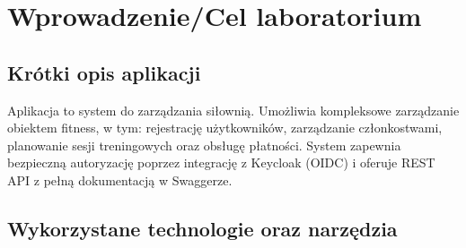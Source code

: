 \documentclass[../../spr.tex]{subfiles}
\begin{document}
\section{Wprowadzenie/Cel laboratorium}

\subsection{Krótki opis aplikacji}
Aplikacja to system do zarządzania siłownią.
Umożliwia kompleksowe zarządzanie obiektem fitness,
w tym: rejestrację użytkowników, zarządzanie członkostwami,
planowanie sesji treningowych oraz obsługę płatności.
System zapewnia bezpieczną autoryzację poprzez integrację z Keycloak (OIDC)
i oferuje REST API z pełną dokumentacją w Swaggerze.
\subsection{Wykorzystane technologie oraz narzędzia}
\end{document}
